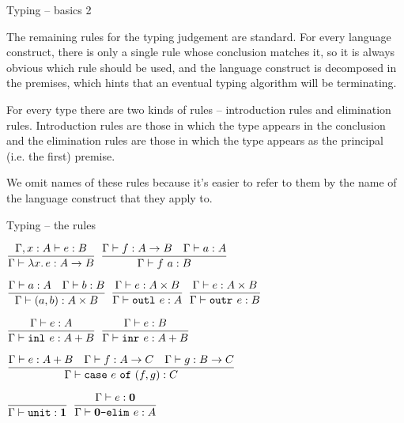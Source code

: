 \documentclass{beamer}
\begin{document}
\begin{frame}{Typing -- basics 2}

The remaining rules for the typing judgement are standard. For every language construct, there is only a single rule whose conclusion matches it, so it is always obvious which rule should be used, and the language construct is decomposed in the premises, which hints that an eventual typing algorithm will be terminating.

\vspace{1em}

For every type there are two kinds of rules -- introduction rules and elimination rules. Introduction rules are those in which the type appears in the conclusion and the elimination rules are those in which the type appears as the principal (i.e. the first) premise.

\vspace{1em}

We omit names of these rules because it's easier to refer to them by the name of the language construct that they apply to.

\end{frame}

\begin{frame}{Typing -- the rules}

\begin{center}
  $\infrule{\typing[\extend{\Gamma}{x}{A}]{e}{B}}{\typing{\fun{x}{e}}{\Fun{A}{B}}}$ \quad
  $\infrule{\typing{f}{\Fun{A}{B}} \quad \typing{a}{A}}{\typing{\app{f}{a}}{B}}$

  \vspace{2em}

  $\infrule{\typing{a}{A} \quad \typing{b}{B}}{\typing{\pair{a}{b}}{\Prod{A}{B}}}$ \quad
  $\infrule{\typing{e}{\Prod{A}{B}}}{\typing{\outl{e}}{A}}$ \quad
  $\infrule{\typing{e}{\Prod{A}{B}}}{\typing{\outr{e}}{B}}$

  \vspace{2em}

  $\infrule{\typing{e}{A}}{\typing{\inl{e}}{\Sum{A}{B}}}$ \quad
  $\infrule{\typing{e}{B}}{\typing{\inr{e}}{\Sum{A}{B}}}$

  \vspace{2em}

  $\infrule{\typing{e}{\Sum{A}{B}} \quad \typing{f}{\Fun{A}{C}} \quad \typing{g}{\Fun{B}{C}}}{\typing{\case{e}{f}{g}}{C}}$

  \vspace{2em}

  $\infrule{}{\typing{\unit}{\Unit}}$ \quad
  $\infrule{\typing{e}{\Empty}}{\typing{\emptyelim{e}}{A}}$
\end{center}

\end{frame}
\end{document}
